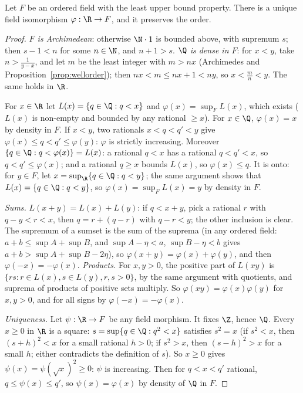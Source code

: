 \begin{theorem}[uniqueness of $\R$]\label{thm:uniqueR}
Let $F$ be an ordered field with the least upper bound property. There is a unique field isomorphism $\varphi:\R\to F$, and it
preserves the order.
\end{theorem}
\begin{proof}
\emph{$F$ is Archimedean}: otherwise $\N\cdot1$ is bounded above, with supremum $s$; then $s-1<n$ for some $n\in\N$, and $n+1>s$. \emph{$\Q$ is
dense in $F$}: for $x<y$, take $n>\frac1{y-x}$, and let $m$ be the least integer with $m>nx$ (Archimedes and Proposition~\ref{prop:wellorder});
then $nx<m\le nx+1<ny$, so $x<\frac mn<y$. The same holds in $\R$.

For $x\in\R$ let $L(x)=\{q\in\Q:q<x\}$ and $\varphi(x)=\sup_FL(x)$, which exists ($L(x)$ is non-empty and bounded by any rational $\ge x$). For
$x\in\Q$, $\varphi(x)=x$ by density in $F$. If $x<y$, two rationals $x<q<q'<y$ give $\varphi(x)\le q<q'\le\varphi(y)$: $\varphi$ is strictly increasing.
Moreover $\{q\in\Q:q<\varphi(x)\}=L(x)$: a rational $q<x$ has a rational $q<q'<x$, so $q<q'\le\varphi(x)$; and a rational $q\ge x$ bounds
$L(x)$, so $\varphi(x)\le q$. It is onto: for $y\in F$, let $x=\sup_\R\{q\in\Q:q<y\}$; the same argument shows that $L(x)=\{q\in\Q:q<y\}$, so
$\varphi(x)=\sup_FL(x)=y$ by density in $F$.

\emph{Sums.} $L(x+y)=L(x)+L(y)$: if $q<x+y$, pick a rational $r$ with $q-y<r<x$, then $q=r+(q-r)$ with $q-r<y$; the other inclusion is clear.
The supremum of a sumset is the sum of the suprema (in any ordered field: $a+b\le\sup A+\sup B$, and $\sup A-\eta<a$, $\sup B-\eta<b$
gives $a+b>\sup A+\sup B-2\eta$), so $\varphi(x+y)=\varphi(x)+\varphi(y)$, and then $\varphi(-x)=-\varphi(x)$.
\emph{Products.} For $x,y>0$, the positive part of $L(xy)$ is $\{rs:r\in L(x),s\in L(y),r,s>0\}$, by the same argument with quotients, and
suprema of products of positive sets multiply. So $\varphi(xy)=\varphi(x)\varphi(y)$ for $x,y>0$, and for all signs by $\varphi(-x)=-\varphi(x)$.

\emph{Uniqueness.} Let $\psi:\R\to F$ be any field morphism. It fixes $\Z$, hence $\Q$. Every $x\ge0$ in $\R$ is a square: $s=\sup\{q\in\Q:q^2<x\}$
satisfies $s^2=x$ (if $s^2<x$, then $(s+h)^2<x$ for a small rational $h>0$; if $s^2>x$, then $(s-h)^2>x$ for a small $h$; either
contradicts the definition of $s$). So $x\ge0$ gives $\psi(x)=\psi(\sqrt x)^2\ge0$: $\psi$ is increasing. Then for $q<x<q'$ rational,
$q\le\psi(x)\le q'$, so $\psi(x)=\varphi(x)$ by density of $\Q$ in $F$.
\end{proof}

